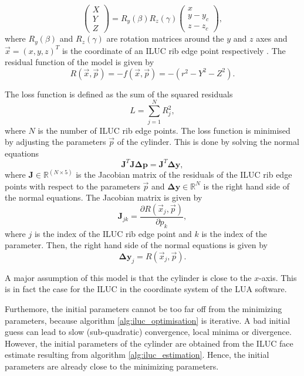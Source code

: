 \begin{equation}
    \begin{pmatrix}
        X \\
        Y \\
        Z
    \end{pmatrix} =
    R_y(\beta) R_z(\gamma) \begin{pmatrix}
        x       \\
        y - y_c \\
        z - z_c
    \end{pmatrix},
    \label{eq:cylinder_coordinates}
\end{equation}
where $R_y(\beta)$ and $R_z(\gamma)$ are rotation matrices around the $y$ and $z$ axes and $\vec{x} = (x, y, z)^T$ is the coordinate of an ILUC rib edge point respectively \cite[equation 5]{cylinder_fit}. 
The residual function of the model is given by
\begin{equation}
    R(\vec{x},\vec{p}) = -f(\vec{x},\vec{p}) = -(r^2 - Y^2 - Z^2).
    \label{eq:cylinder_residual}
\end{equation}

The loss function is defined as the sum of the squared residuals
\begin{equation}
    L = \sum_{j=1}^{N} R_j^2,
    \label{eq:cylinder_loss}
\end{equation}
where $N$ is the number of ILUC rib edge points. The loss function is minimised by adjusting the parameters $\vec{p}$ of the cylinder. This is done by solving the normal equations
\begin{equation}
    \mathbf{J}^T \mathbf{J} \mathbf{\Delta p} = \mathbf{J}^T \mathbf{\Delta y},
    \label{eq:cylinder_normal_equations}
\end{equation}
where $\mathbf{J} \in \mathbb{R}^{(N\times5)}$ is the Jacobian matrix of the residuals of the ILUC rib edge points with respect to the parameters $\vec{p}$ and $\mathbf{\Delta y}\in\mathbb{R}^N$ is the right hand side of the normal equations. The Jacobian matrix is given by
\begin{equation}
    \mathbf{J}_{jk} = \frac{\partial R(\vec{x}_j, \vec{p})}{\partial p_k}, 
\end{equation}
where $j$ is the index of the ILUC rib edge point and $k$ is the index of the parameter. Then, the right hand side of the normal equations is given by
\begin{equation}
    \mathbf{\Delta y}_j = R(\vec{x}_j, \vec{p}).
    \label{eq:cylinder_rhs}
\end{equation}

A major assumption of this model is that the cylinder is close to the $x$-axis. This is in fact the case for the ILUC in the coordinate system of the LUA software. 

Furthemore, the initial parameters cannot be too far off from the minimizing parameters, because algorithm \ref{alg:iluc_optimisation} is iterative. A bad initial guess can lead to slow (sub-quadratic) convergence, local minima or divergence. However, the initial parameters of the cylinder are obtained from the ILUC face estimate resulting from algorithm \ref{alg:iluc_estimation}. Hence, the initial parameters are already close to the minimizing parameters.